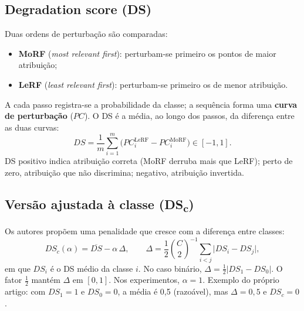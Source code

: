 \documentclass[11pt,a4paper]{article}
\begin{document}
\subsection{Degradation score (DS)}
Duas ordens de perturbação são comparadas:
\begin{itemize}
\item \textbf{MoRF} (\textit{most relevant first}): perturbam-se primeiro os pontos de maior atribuição;
\item \textbf{LeRF} (\textit{least relevant first}): perturbam-se primeiro os de menor atribuição.
\end{itemize}
A cada passo registra-se a probabilidade da classe; a sequência forma uma \textbf{curva de perturbação} ($PC$). O DS é a média, ao longo dos passos, da diferença entre as duas curvas:
\[
DS = \frac{1}{m}\sum_{i=1}^{m}\big(PC^{\text{LeRF}}_i - PC^{\text{MoRF}}_i\big) \in [-1,1].
\]
DS positivo indica atribuição correta (MoRF derruba mais que LeRF); perto de zero, atribuição que não discrimina; negativo, atribuição invertida.

\subsection{Versão ajustada à classe (DS\textsubscript{c})}
Os autores propõem uma penalidade que cresce com a diferença entre classes:
\[
DS_c(α) = \overline{DS} - α\,\Delta, \qquad \Delta = \frac{1}{2}\binom{C}{2}^{-1}\sum_{i<j}\lvert DS_i - DS_j\rvert,
\]
em que $DS_i$ é o DS médio da classe $i$. No caso binário, $\Delta = \frac{1}{2}\lvert DS_1 - DS_0\rvert$. O fator $\frac{1}{2}$ mantém $\Delta$ em $[0,1]$. Nos experimentos, $α = 1$. Exemplo do próprio artigo: com $DS_1 = 1$ e $DS_0 = 0$, a média é 0,5 (razoável), mas $\Delta = 0{,}5$ e $DS_c = 0$.
\end{document}
